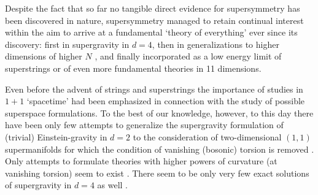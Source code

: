 \documentclass[a4paper,10pt]{article}
\newcommand{\N}{N}
\renewcommand{\^}{{}^}
\renewcommand{\_}{\!{}_}
\begin{document}

Despite the fact that so far no tangible direct evidence for
supersymmetry has been discovered in nature, supersymmetry
\cite{Wess:1977fn} managed to retain continual interest within the aim to
arrive at a fundamental `theory of everything' ever since its
discovery: first in supergravity \cite{Freedman:1976xh} in $d = 4$, then in
generalizations to higher dimensions of higher $\N$
\cite{Vafa:1996xn}, and finally incorporated as a low energy limit of
superstrings \cite{Witten:1995ex} or of even more fundamental theories
\cite{Sezgin:1997cj} in 11 dimensions.

Even before the advent of strings and superstrings the importance of
studies in $1+1$ `spacetime' had been emphasized \cite{Howe:1979ia}
in connection with the study of possible superspace formulations. 
To the best of our knowledge, however, to this
day there have been only few attempts  to generalize the supergravity
formulation of (trivial) Einstein-gravity in $d = 2$ to the
consideration of two-dimensional $(1, 1)$ supermanifolds for which the
condition of vanishing (bosonic) torsion is removed 
\cite{Ertl:Diss,EKK}. Only attempts to
formulate theories with higher powers of curvature (at vanishing
torsion) seem to exist \cite{Hindawi:1996fy}. There seem to be only
very few exact solutions of supergravity in $d = 4$ as well
\cite{Aichelburg:1978fn}.
\end{document}

